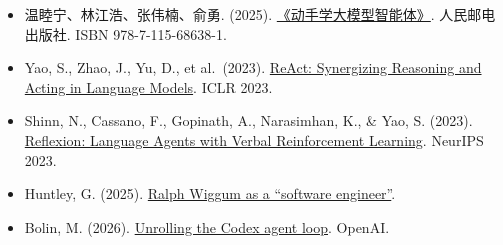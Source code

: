 \vspace{0.25em}
\begin{itemize}
\tightlist
\item
  温睦宁、林江浩、张伟楠、俞勇. (2025). \href{https://haa.boyuai.com/}{《动手学大模型智能体》}. 人民邮电出版社. ISBN 978-7-115-68638-1.
\item
  Yao, S., Zhao, J., Yu, D., et al.~(2023). \href{https://arxiv.org/abs/2210.03629}{ReAct: Synergizing Reasoning and Acting in Language Models}. ICLR 2023.
\item
  Shinn, N., Cassano, F., Gopinath, A., Narasimhan, K., \& Yao, S. (2023). \href{https://arxiv.org/abs/2303.11366}{Reflexion: Language Agents with Verbal Reinforcement Learning}. NeurIPS 2023.
\item
  Huntley, G. (2025). \href{https://ghuntley.com/ralph/}{Ralph Wiggum as a ``software engineer''}.
\item
  Bolin, M. (2026). \href{https://openai.com/index/unrolling-the-codex-agent-loop/}{Unrolling the Codex agent loop}. OpenAI.
\end{itemize}

\clearpage
